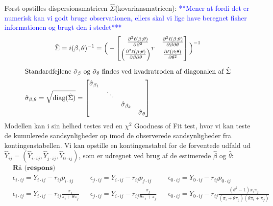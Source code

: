 \documentclass[11pt,a4paper]{article}
\begin{document}
Først opstilles dispersionsmatricen $\hat{\Sigma}$(kovariansmatricen): \textcolor{blue}{**Mener at fordi det er numerisk kan vi godt bruge observationen, ellers skal vi lige have beregnet fisher informationen og brugt den i stedet*** }
\begin{align*}
&\hat{\Sigma}=i(\beta,\theta)^{-1}=
\Big{(}-\begin{bmatrix}
\frac{\partial^2 \ell(\beta;\theta)}{\partial \beta^2} &\frac{\partial^2 \ell(\beta;\theta)}{\partial \beta \partial \theta} \\
\Big{(}\frac{\partial^2 \ell(\beta;\theta)}{\partial \beta \partial \theta}\Big{)}^T & \frac{\partial \ell(\beta;\theta)}{\partial \theta^2}
\end{bmatrix}\Big{)}^{-1}\\
\end{align*}
\begin{align}
\intertext{Standardfejlene $\hat{\sigma}_\beta$ og $\hat{\sigma}_\theta$ findes ved kvadratroden af diagonalen af $\hat{\Sigma}$}
\hat{\sigma}_{\beta,\theta}=\sqrt{\text{diag}(\hat{\Sigma})}=
\begin{bmatrix}
\hat{\sigma}_{\beta_1}& &\\
& \ddots & \\
& & \hat{\sigma}_{\beta_k} \\
& & & \hat{\sigma}_{\theta}
\end{bmatrix}
\end{align}
Modellen kan i sin helhed testes ved en $\chi^2$ Goodness of Fit test, hvor vi kan teste de kumulerede sandsynligheder op imod de observerede sandsynligheder fra kontingenstabellen. Vi kan opstille en kontingenstabel for de forventede udfald ud $\hat{Y}_{ij} = (\hat{Y}_{i\cdot ij},\hat{Y}_{j\cdot ij},\hat{Y}_{0\cdot ij})$, som er udregnet ved brug af de estimerede $\hat{\beta}$ og $\hat{\theta}$:
\begin{align*}
&\textbf{Rå (respons) residualer}\\
&\epsilon_{i\cdot ij}=Y_{i\cdot ij}-r_{ij}p_{i\cdot ij}
&&\epsilon_{j\cdot ij}=Y_{i\cdot ij}-r_{ij} p_{j\cdot ij}
&&\epsilon_{0\cdot ij}=Y_{0\cdot ij}-r_{ij} p_{0\cdot ij}\\
&\epsilon_{i\cdot ij}=Y_{i\cdot ij}-r_{ij} \frac{\pi_i}{\pi_i+\theta \pi_j}
&&\epsilon_{j\cdot ij}=Y_{i\cdot ij}-r_{ij} \frac{\pi_j}{\theta \pi_i+ \pi_j}
&&\epsilon_{0\cdot ij}=Y_{0\cdot ij}-r_{ij} \frac{(\theta^2-1)\pi_i\pi_j}{(\pi_i+\theta \pi_j)(\theta
\pi_i + \pi_j)}\\
\end{align*}
\end{document}
